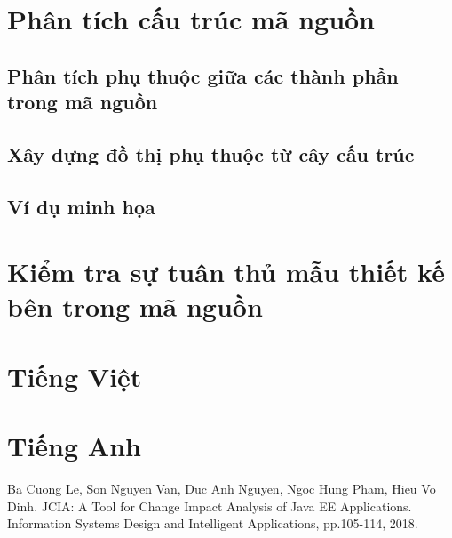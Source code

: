 \documentclass[12pt]{report}
\begin{document}
\newpage
\section{Phân tích cấu trúc mã nguồn}
\subsection{Phân tích phụ thuộc giữa các thành phần trong mã nguồn}
\subsection{Xây dựng đồ thị phụ thuộc từ cây cấu trúc}
\subsection{Ví dụ minh họa}

\newpage
\section{Kiểm tra sự tuân thủ mẫu thiết kế bên trong mã nguồn}

\begin{thebibliography}{9}
	\section*{Tiếng Việt}
	
	\section*{Tiếng Anh}
	Ba Cuong Le, Son Nguyen Van, Duc Anh Nguyen, Ngoc Hung Pham, Hieu Vo Dinh. JCIA: A Tool for Change Impact Analysis of Java EE Applications. Information Systems Design and Intelligent Applications, pp.105-114, 2018.
	
	
\end{thebibliography}
\end{document}
